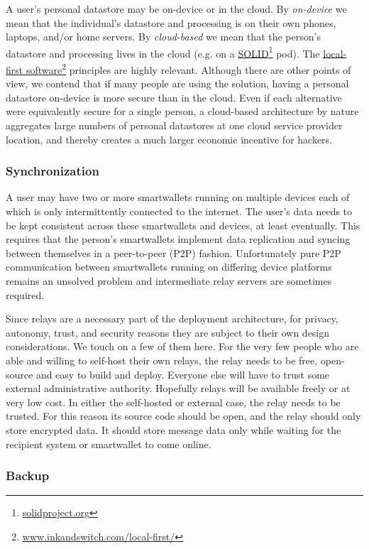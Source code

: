 \documentclass[11pt, oneside]{article}   	%
\newcommand{\hyperfootnote}[1][]{\def\ArgI{{#1}}\hyperfootnoteRelay}
\newcommand\hyperfootnoteRelay[2][]{\href{#1#2}{\ArgI}\footnote{\href{#1#2}{#2}}}
\begin{document}
A user's personal datastore may be on-device or in the cloud. By \emph{on-device} we mean that the individual's datastore and processing is on their own phones, laptops, and/or home servers. By \emph{cloud-based} we mean that the person's datastore and processing lives in the cloud (e.g. on a \hyperfootnote[SOLID][https://]{solidproject.org} pod). The \hyperfootnote[local-first software][https://]{www.inkandswitch.com/local-first/} principles are highly relevant. Although there are other points of view, we contend that if many people are using the solution, having a personal datastore on-device is more secure than in the cloud. Even if each alternative were equivalently secure for a single person, a cloud-based architecture by nature aggregates large numbers of personal datastores at one cloud service provider location, and thereby creates a much larger economic incentive for hackers. 

\subsubsection{Synchronization}

A user may have two or more smartwallets running on multiple devices each of which is only intermittently connected to the internet. The user's data needs to be kept consistent across these smartwallets and devices, at least eventually. This requires that the person's smartwallets implement data replication and syncing between themselves in a peer-to-peer (P2P) fashion. Unfortunately pure P2P communication between smartwallets running on differing device platforms remains an unsolved problem and intermediate relay servers are sometimes required. 

Since relays are a necessary part of the deployment architecture, for privacy, autonomy, trust, and security reasons they are subject to their own design considerations. We touch on a few of them here. For the very few people who are able and willing to self-host their own relays, the relay needs to be free, open-source and easy to build and deploy. Everyone else will have to trust some external administrative authority. Hopefully relays will be available freely or at very low cost. In either the self-hosted or external case, the relay needs to be trusted. For this reason its source code should be open, and the relay should only store encrypted data. It should store message data only while waiting for the recipient system or smartwallet to come online.

\subsubsection{Backup} 
\end{document}
